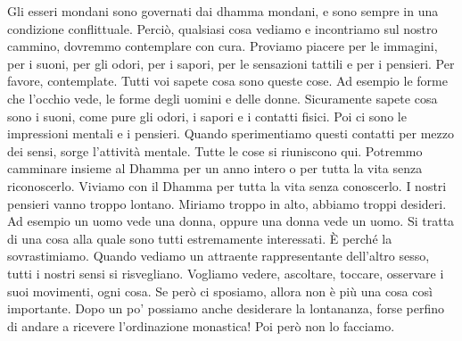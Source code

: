 Gli esseri mondani sono governati dai dhamma mondani, e sono
sempre in una condizione conflittuale. Perciò, qualsiasi cosa vediamo e
incontriamo sul nostro cammino, dovremmo contemplare con cura. Proviamo
piacere per le immagini, per i suoni, per gli odori, per i sapori, per
le sensazioni tattili e per i pensieri. Per favore, contemplate. Tutti
voi sapete cosa sono queste cose. Ad esempio le forme che l'occhio vede,
le forme degli uomini e delle donne. Sicuramente sapete cosa sono i
suoni, come pure gli odori, i sapori e i contatti fisici. Poi ci sono le
impressioni mentali e i pensieri. Quando sperimentiamo questi contatti
per mezzo dei sensi, sorge l'attività mentale. Tutte le cose si
riuniscono qui. Potremmo camminare insieme al Dhamma per un anno intero
o per tutta la vita senza riconoscerlo. Viviamo con il Dhamma per tutta
la vita senza conoscerlo. I nostri pensieri vanno troppo lontano.
Miriamo troppo in alto, abbiamo troppi desideri. Ad esempio un uomo vede
una donna, oppure una donna vede un uomo. Si tratta di una cosa alla
quale sono tutti estremamente interessati. È perché la sovrastimiamo.
Quando vediamo un attraente rappresentante dell'altro sesso, tutti i
nostri sensi si risvegliano. Vogliamo vedere, ascoltare, toccare,
osservare i suoi movimenti, ogni cosa. Se però ci sposiamo, allora non è
più una cosa così importante. Dopo un po' possiamo anche desiderare la
lontananza, forse perfino di andare a ricevere l'ordinazione monastica!
Poi però non lo facciamo.

